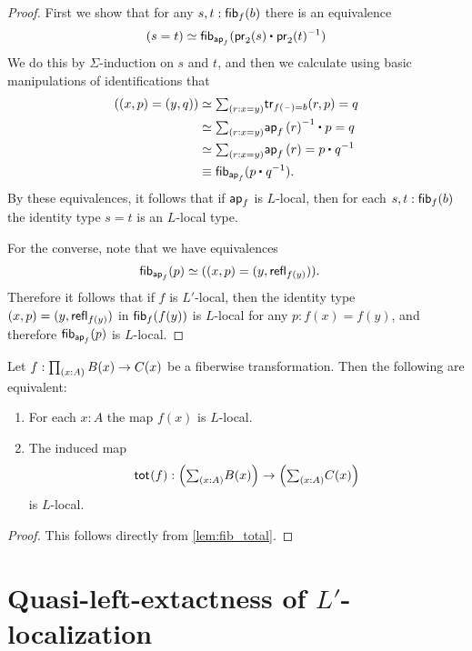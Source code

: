 \begin{proof}
First we show that for any $s,t:\mathsf{fib}_{f}(b)$ there is an equivalence
\begin{equation*}
\eqv{(s=t)}{\fib{\apfunc{f}}{\ct{\proj 2(s)}{\proj 2(t)^{-1}}}}
\end{equation*}
We do this by $\Sigma$-induction on $s$ and $t$, and then we calculate using basic manipulations of identifications that
\begin{align*}
(\pairr{x,p}=\pairr{y,q}) & \eqvsym \sm{r:x=y} \mathsf{tr}_{f(\blank)=b}(r,p)=q \\
& \eqvsym \sm{r:x=y} \ct{\ap{f}{r}^{-1}}{p}=q \\
& \eqvsym \sm{r:x=y} \ap{f}{r}=\ct{p}{q^{-1}} \\
& \jdeq \fib{\apfunc{f}}{\ct{p}{q^{-1}}}.
\end{align*}
By these equivalences, it follows that if $\mathsf{ap}_{f}$ is $L$-local, then for each $s,t:\mathsf{fib}_{f}(b)$ the identity type $s=t$ is an $L$-local type.

For the converse, note that we have equivalences
\begin{align*}
\mathsf{fib}_{\mathsf{ap}_{f}}(p) & \simeq ((x,p)=(y,\mathsf{refl}_{f(y)})).
\end{align*}
Therefore it follows that if $f$ is $L'$-local, then the identity type $(x,p)=(y,\mathsf{refl}_{f(y)})$ in $\mathsf{fib}_{f}(f(y))$ is $L$-local for any $p:f(x)=f(y)$, and therefore $\mathsf{fib}_{\mathsf{ap}_{f}}(p)$ is $L$-local. 
\end{proof}

\begin{thm}
Let $f:\prd{x:A}B(x)\to C(x)$ be a fiberwise transformation. Then the following are equivalent:
\begin{enumerate}
\item For each $x:A$ the map $f(x)$ is $L$-local.
\item The induced map 
\begin{equation*}
\total{f}:\Big(\sm{x:A}B(x)\Big)\to\Big(\sm{x:A}C(x)\Big)
\end{equation*}
is $L$-local.
\end{enumerate}
\end{thm}

\begin{proof}
This follows directly from \cref{lem:fib_total}.
\end{proof}

\section{Quasi-left-extactness of \texorpdfstring{$L'$}{L'}-localization}\label{ss:lex}

